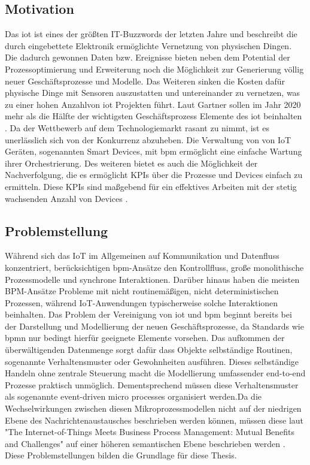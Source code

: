 \documentclass[a4paper, 12pt, twoside, headsepline=true]{scrartcl} %
\begin{document}
\subsection{Motivation} \label{sec:subsection}
Das \ac{iot} ist eines der größten IT-Buzzwords der letzten Jahre und beschreibt die durch eingebettete Elektronik ermöglichte Vernetzung von physischen Dingen. Die dadurch gewonnen Daten bzw. Ereignisse bieten neben dem Potential der
Prozessoptimierung und Erweiterung noch die Möglichkeit zur Generierung völlig neuer Geschäftsprozesse und Modelle. 
Das Weiteren sinken die Kosten dafür physische Dinge mit Sensoren auszustatten und untereinander zu vernetzen, was zu einer hohen Anzahlvon \ac{iot} Projekten führt. Laut Gartner sollen im Jahr 2020 mehr als die Hälfte der wichtigsten Geschäftsprozess Elemente des \ac{iot} beinhalten \cite{garnteriotgrowth}. Da der Wettbewerb auf dem Technologiemarkt rasant zu nimmt, ist es unerlässlich sich von der Konkurrenz abzuheben. Die Verwaltung von von IoT Geräten, sogenannten Smart Devices, mit \ac{bpm} ermöglicht eine einfache Wartung ihrer Orchestrierung. Des weiteren bietet es auch die Möglichkeit der Nachverfolgung, die es ermöglicht KPIs über die Prozesse und Devices einfach zu ermitteln. Diese KPIs sind maßgebend für ein effektives Arbeiten mit der stetig wachsenden Anzahl von Devices \cite{bpmofthings}.

\subsection{Problemstellung} 
Während sich das IoT im Allgemeinen auf Kommunikation und Datenfluss konzentriert, berücksichtigen \ac{bpm}-Ansätze den Kontrollfluss, große monolithische Prozessmodelle und synchrone Interaktionen. Darüber hinaus haben die meisten BPM-Ansätze Probleme mit nicht routinemäßigen, nicht deterministischen Prozessen, während IoT-Anwendungen typischerweise solche Interaktionen beinhalten. Das Problem der Vereinigung von \ac{iot} und \ac{bpm} beginnt bereits bei der Darstellung und Modellierung der neuen Geschäftsprozesse, da Standards wie \ac{bpmn} nur bedingt hierfür geeignete Elemente vorsehen. Das aufkommen der überwältigenden Datenmenge sorgt dafür dass Objekte selbständige Routinen, sogenannte Verhaltensmuster oder Gewohnheiten ausführen. Dieses selbständige Handeln ohne zentrale Steuerung macht die Modellierung umfassender end-to-end Prozesse praktisch unmöglich. Dementsprechend müssen diese Verhaltensmuster als sogenannte event-driven micro processes organisiert werden.Da die Wechselwirkungen zwischen diesen Mikroprozessmodellen nicht auf der niedrigen Ebene des Nachrichtenaustausches beschrieben werden können, müssen diese laut "The Internet-of-Things Meets Business Process Management: Mutual Benefits and Challenges" auf einer höheren semantischen Ebene beschrieben werden \cite{iotmeetsbpm}. Diese Problemstellungen bilden die Grundlage für diese Thesis.
\end{document}
